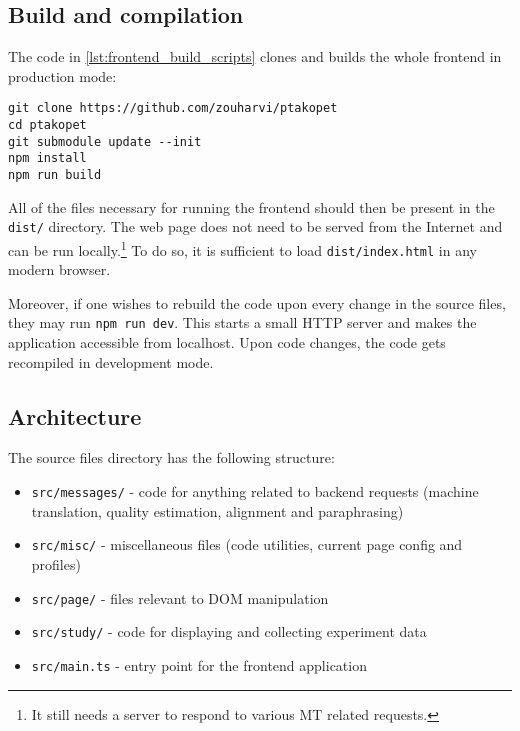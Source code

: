 \subsection{Build and compilation}

The code in \cref{lst:frontend_build_scripts} clones and builds the whole frontend in production mode:

\begin{lstlisting}[language=none, caption={Shell code for building the whole frontend},label={lst:frontend_build_scripts}]
git clone https://github.com/zouharvi/ptakopet
cd ptakopet
git submodule update --init
npm install
npm run build
\end{lstlisting}

All of the files necessary for running the frontend should then be present in the \texttt{dist/} directory. The web page does not need to be served from the Internet and can be run locally.\footnote{It still needs a server to respond to various MT related requests.} To do so, it is sufficient to load \texttt{dist/index.html} in any modern browser.

Moreover, if one wishes to rebuild the code upon every change in the source files, they may run \lstinline{npm run dev}. This starts a small HTTP server and makes the application accessible from localhost. Upon code changes, the code gets recompiled in development mode.

\subsection{Architecture}

The source files directory has the following structure:

\begin{itemize}
    \item \texttt{src/messages/} - code for anything related to backend requests (machine translation, quality estimation, alignment and paraphrasing)
    \item \texttt{src/misc/} - miscellaneous files (code utilities, current page config and profiles)
    \item \texttt{src/page/} - files relevant to DOM manipulation
    \item \texttt{src/study/} - code for displaying and collecting experiment data
    \item \texttt{src/main.ts} - entry point for the frontend application
\end{itemize}



